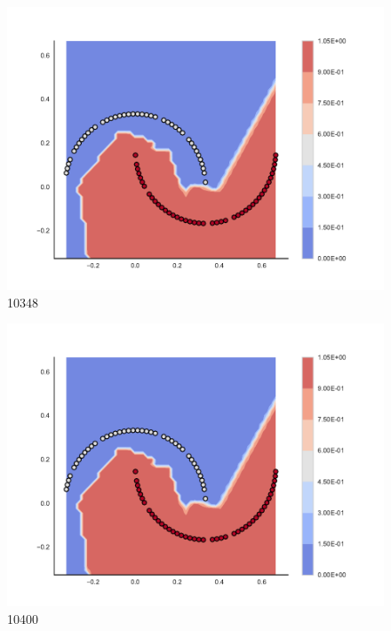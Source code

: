 \begin{subfigure}[b]{0.09\textwidth}
    \includegraphics[clip, trim=2.35cm 1.75cm 4.5cm 0cm,width=\textwidth]{img/convergence/10348.pdf}
    \caption{10348}
    \label{fig:convergence_10348}
\end{subfigure}
%
\begin{subfigure}[b]{0.09\textwidth}
    \includegraphics[clip, trim=2.35cm 1.75cm 4.5cm 0cm,width=\textwidth]{img/convergence/10400.pdf}
    \caption{10400}
    \label{fig:convergence_10400}
\end{subfigure}
%
